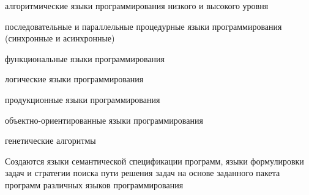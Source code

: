 \begin{scnsubstruct}
{\begin{scnitemize}
{\begin{scnitemize}
                \item{алгоритмические языки программирования низкого и высокого уровня}
                \item{последовательные и параллельные процедурные языки программирования (синхронные и асинхронные)}
                \item{функциональные языки программирования}
                \item{логические языки программирования}
                \item{продукционные языки программирования}
                \item{объектно-ориентированные языки программирования}
                \item{генетические алгоритмы}
            \end{scnitemize}
        }
        \item{Создаются языки семантической спецификации программ, языки формулировки задач и стратегии поиска
            пути решения задач на основе заданного пакета программ различных языков программирования}
    \end{scnitemize}
    }
\end{scnsubstruct}